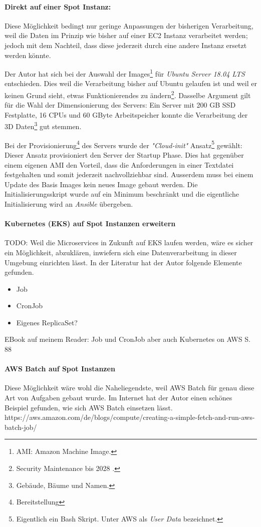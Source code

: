 \paragraph{Direkt auf einer Spot Instanz:}
Diese Möglichkeit bedingt nur geringe Anpassungen der bisherigen Verarbeitung, weil die Daten im Prinzip wie bisher auf einer EC2 Instanz verarbeitet werden; jedoch mit dem Nachteil, dass diese jederzeit durch eine andere Instanz ersetzt werden könnte.

Der Autor hat sich bei der Auswahl der Images\footnote{AMI: Amazon Machine Image.} für \emph{Ubuntu Server 18.04 LTS} entschieden. Dies weil die Verarbeitung bisher auf Ubuntu gelaufen ist und weil er keinen Grund sieht, etwas Funktionierendes zu ändern\footnote{Security Maintenance bis 2028 \cite{Ubuntu2020}.}. Dasselbe Argument gilt für die Wahl der Dimensionierung des Servers: Ein Server mit 200 GB SSD Festplatte, 16 CPUs und 60 GByte Arbeitspeicher konnte die Verarbeitung der 3D Daten\footnote{Gebäude, Bäume und Namen.} gut stemmen.

Bei der Provisionierung\footnote{Bereitstellung} des Servers wurde der \emph{"Cloud-init"} Ansatz\footnote{Eigentlich ein Bash Skript. Unter AWS als \emph{User Data} bezeichnet.} gewählt: Dieser Ansatz provisioniert den Server der Startup Phase. Dies hat gegenüber einem eigenen AMI den Vorteil, dass die Anforderungen in einer Textdatei festgehalten und somit jederzeit nachvollziehbar sind. Ausserdem muss bei einem Update des Basis Images kein neues Image gebaut werden.
Die Initialisierungsskript wurde auf ein Minimum beschränkt und die eigentliche Initialisierung wird an \emph{Ansible} übergeben. 

\paragraph{Kubernetes (EKS) auf Spot Instanzen erweitern}
TODO: Weil die Microservices in Zukunft auf EKS laufen werden, wäre es sicher ein Möglichkeit, abzuklären, inwiefern sich eine Datenverarbeitung in dieser Umgebung einrichten lässt. In der Literatur hat der Autor folgende Elemente gefunden.

\begin{itemize}
\item Job
\item CronJob
\item Eigenes ReplicaSet?
\end{itemize}

EBook auf meinem Reader: Job und CronJob aber auch Kubernetes on AWS S. 88

\paragraph{AWS Batch auf Spot Instanzen}
Diese Möglichkeit wäre wohl die Naheliegendste, weil AWS Batch für genau diese Art von Aufgaben gebaut wurde. Im Internet hat der Autor einen schönes Beispiel gefunden, wie sich AWS Batch einsetzen lässt.
https://aws.amazon.com/de/blogs/compute/creating-a-simple-fetch-and-run-aws-batch-job/
